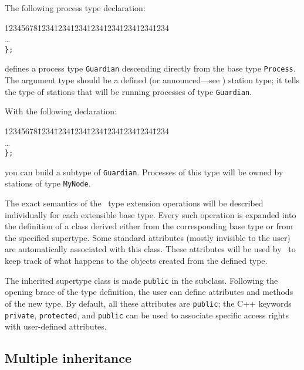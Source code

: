 \noindent
The following process type declaration:
{\tt\begin{tabbing}
12345678\=1234\=1234\=1234\=1234\=1234\=1234\=1234\=1234\kill
{}\\
\> \>\ldots \\
\> {\tt \};}
\end{tabbing}}
\noindent
defines a process type {\tt Guardian} descending directly from the base type
{\tt Process}.
The argument type should be a defined (or announced---see )
station type;
it tells the type of stations that will be running processes of type
{\tt Guardian}.

With the following declaration:
{\tt\begin{tabbing}
12345678\=1234\=1234\=1234\=1234\=1234\=1234\=1234\=1234\kill
{}\\
\> \>\ldots \\
\> {\tt \};}
\end{tabbing}}
\noindent
you can build a subtype of {\tt Guardian}.
Processes of this type will be owned by stations of type {\tt MyNode}.

\medskip

\noindent
The exact semantics of the \smurph\ type extension operations
will be described individually for each extensible base type.
Every such operation is expanded into the definition of a class
derived either from the corresponding base type or from
the specified supertype.
Some standard attributes (mostly invisible to the user) are automatically
associated with this class.
These attributes will be used by \smurph\ to keep track of what happens
to the objects created from the defined type.

The inherited supertype class is made {\tt public} in the subclass.
Following the opening brace of the type definition, the user can define
attributes and methods of the new type.
By default, all these attributes are {\tt public}; the C++ keywords
{\tt private}, {\tt protected}, and {\tt public} can be used to associate
specific access rights with user-defined attributes.

\subsection {Multiple inheritance}
\label{rm_st_mi}

